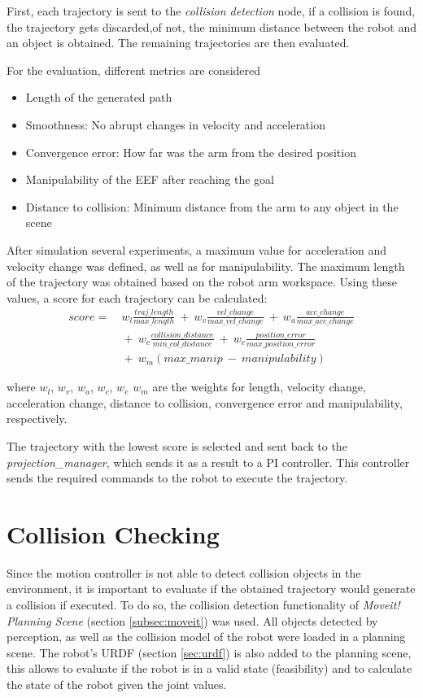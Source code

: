 First, each trajectory is sent to the \textit{collision detection} node, if a collision is found, the trajectory gets discarded,of not, the minimum distance between the robot and an object is obtained. The remaining trajectories are then evaluated.

For the evaluation, different metrics are considered
\begin{itemize}
	\item Length of the generated path
	\item Smoothness: No abrupt changes in velocity and acceleration
	\item Convergence error: How far was the arm from the desired position
	\item Manipulability of the EEF after reaching the goal
	\item Distance to collision: Minimum distance from the arm to any object in the scene
\end{itemize}

After simulation several experiments, a maximum value for acceleration and velocity change was defined, as well as for manipulability. The maximum length of the trajectory was obtained based on the robot arm workspace. Using these values, a score for each trajectory can be calculated:
\begin{equation}
\begin{aligned}
score = &\ w_l\frac{traj\_length}{max\_length}\ +\ w_v\frac{vel\_change}{max\_vel\_change}\ +\ w_a\frac{acc\_change}{max\_acc\_change} \\
 & \ +\ w_c\frac{collision\_distance}{min\_col\_distance} 
\ +\ w_e\frac{position\_error}{max\_position\_error}\\
 & \ +\ w_m(max\_manip\ -\ manipulability)
\end{aligned}
\label{eq:score}
\end{equation}


where $w_l$, $w_v$, $w_a$, $w_c$, $w_e$ $w_m$ are the weights for length, velocity change, acceleration change, distance to collision, convergence error and manipulability, respectively.

The trajectory with the lowest score is selected and sent back to the \textit{projection\_manager}, which sends it as a result to a PI controller. This controller sends the required commands to the robot to execute the trajectory.


\section{Collision Checking}
\label{sec:collision}
Since the motion controller is not able to detect collision objects in the environment, it is important to evaluate if the obtained trajectory would generate a collision if executed. To do so, the collision detection functionality of \textit{Moveit! Planning Scene} (section \ref{subsec:moveit}) was used. All objects detected by perception, as well as the collision model of the robot were loaded in a planning scene. The robot's URDF (section \ref{sec:urdf}) is also added to the planning scene, this allows to evaluate if the robot is in a valid state (feasibility) and to calculate the state of the robot given the joint values.

